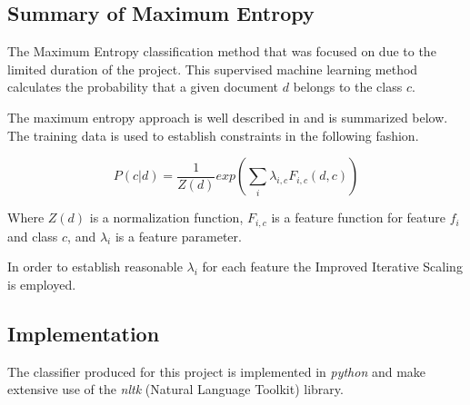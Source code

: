 \documentclass[12pt]{article}
\begin{document}
\subsection{Summary of Maximum Entropy}

The Maximum Entropy classification method that was focused on due to the
limited duration of the project. This supervised machine learning method
calculates the probability that a given document $d$ belongs to the class $c$.

The maximum entropy approach is well described in \cite{Nigam1999} and is
summarized below. The training data is used to establish constraints in the
following fashion.

\begin{equation}
    P(c | d) = \frac{1}{Z(d)} exp( \sum\limits_{i} \lambda _{i,c} F_{i,c}(d,c) )
\end{equation}

Where $Z(d)$ is a normalization function, $F_{i,c}$ is a feature function for
feature $f_{i}$ and class $c$, and $\lambda_{i}$ is a feature parameter.

In order to establish reasonable $\lambda_{i}$ for each feature the Improved
Iterative Scaling is employed.


\subsection{Implementation}

The classifier produced for this project is implemented in \textit{python} and make
extensive use of the \textit{nltk} (Natural Language Toolkit) library.
\end{document}
